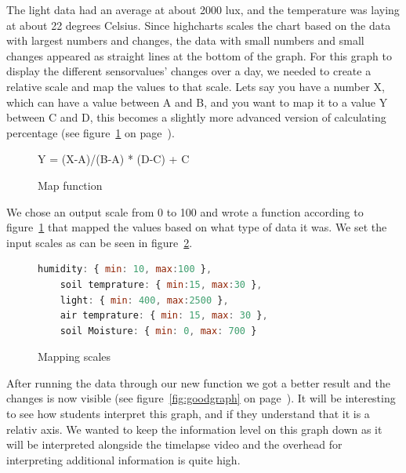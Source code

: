 The light data had an average at about 2000 lux, and the temperature was laying at about 22 degrees Celsius. Since highcharts scales the chart based on the data with largest numbers and changes, the data with small numbers and small changes appeared as straight lines at the bottom of the graph. 
For this graph to display the different sensorvalues’ changes over a day, we needed to create a relative scale and map the values to that scale. Lets say you have a number X, which can have a value between A and B, and you want to map it to a value Y between C and D, this becomes a slightly more advanced version of calculating percentage (see figure~\ref{fig:mapfunc} on page~\pageref{fig:mapfunc}).

\begin{figure}
\centering
Y = (X-A)/(B-A) * (D-C) + C
\caption{Map function}
\label{fig:mapfunc}
\end{figure}

We chose an output scale from 0 to 100 and wrote a function according to figure~\ref{fig:mapfunc} that mapped the values based on what type of data it was. We set the input scales as can be seen in figure~\ref{fig:mapscale}.

\begin{figure}
	\begin{lstlisting}[language=javascript]
	humidity: { min: 10, max:100 },
	soil temprature: { min:15, max:30 },
	light: { min: 400, max:2500 },
	air temprature: { min: 15, max: 30 },
	soil Moisture: { min: 0, max: 700 }
	\end{lstlisting}
	\caption{Mapping scales}
	\label{fig:mapscale}
\end{figure}

After running the data through our new function we got a better result and the changes is now visible (see figure~\ref{fig:goodgraph} on page~\pageref{fig:goodgraph}). It will be interesting to see how students interpret this graph, and if they understand that it is a relativ axis. We wanted to keep the information level on this graph down as it will be interpreted alongside the timelapse video and the overhead for interpreting additional information is quite high.  

